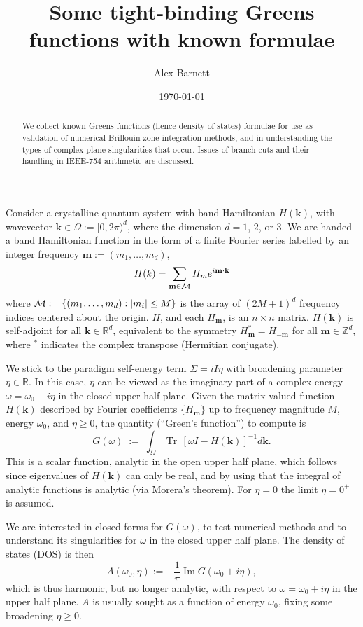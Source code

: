 \documentclass[11pt]{article}
\newcommand{\be}{\begin{equation}}
\newcommand{\ee}{\end{equation}}
\newcommand{\mbf}[1]{{\mathbf #1}}
\newcommand{\R}{\mathbb{R}}
\newcommand{\Z}{\mathbb{Z}}
\DeclareMathOperator{\im}{Im}
\DeclareMathOperator{\tr}{Tr}
\newcommand{\om}{\omega}
\newcommand{\BZ}{\Omega}
\newcommand{\kk}{\mbf{k}}
\newcommand{\mm}{\mbf{m}}
\begin{document}
\title{Some tight-binding Greens functions with known formulae}
\author{Alex Barnett}
\date{\today}
\maketitle
\begin{abstract}
  We collect known Greens functions (hence density of states)
  formulae for use as validation
  of numerical Brillouin zone integration methods, and in understanding
  the types of complex-plane singularities that occur.
  Issues of branch cuts and their handling in IEEE-754 arithmetic are discussed.
\end{abstract}

Consider a crystalline quantum system with band Hamiltonian $H(\kk)$,
with wavevector $\kk\in \BZ := [0,2\pi)^d$, where the dimension $d=1$, $2$, or $3$.
We are handed a band Hamiltonian function in the form of a finite Fourier
series labelled by an integer frequency $\mm := (m_1,\dots,m_d)$,
\be
H(k) = \sum_{\mm\in{\cal M}} H_m e^{i\mm\cdot \kk}
\label{Hk}
\ee
where ${\cal M} := \{(m_1,\dots,m_d): |m_i|\le M\}$ is the array of 
$(2M+1)^d$ frequency indices centered about the origin.
$H$, and each $H_\mm$, is an $n\times n$ matrix.
$H(\kk)$ is self-adjoint for all $\kk\in\R^d$,
equivalent to the symmetry $H_\mm^* = H_{-\mm}$ for all $\mm\in\Z^d$, where
$^*$ indicates the complex transpose (Hermitian conjugate).

We stick to the paradigm self-energy term $\Sigma = iI\eta$
with broadening parameter $\eta\in\R$.
In this case, $\eta$ can be viewed as the imaginary part of
a complex energy $\om = \om_0 + i\eta$ in the closed upper half plane.
Given the matrix-valued function $H(\kk)$
described by Fourier coefficients $\{H_\mm\}$ up to frequency magnitude $M$,
energy $\om_0$, and $\eta\ge0$,
the quantity (``Green's function'') to compute is
\be
G(\om) \;:=\;
\int_\BZ \tr\, [\om I - H(\kk)]^{-1} d\kk.
\label{G}
\ee
This is a scalar function, analytic in the open upper half plane,
which follows since eigenvalues of $H(\kk)$ can only be real, and by
using that the integral of analytic functions is analytic (via Morera's theorem).
For $\eta=0$ the limit $\eta=0^+$ is assumed.

We are interested in closed forms for $G(\om)$, to
test numerical methods and to understand
its singularities for $\om$ in the closed upper half plane.
The density of states (DOS) is then
\be
A(\om_0,\eta) := -\frac{1}{\pi}\im G(\om_0+i\eta),
\label{DOS}
\ee
which is thus harmonic, but no longer analytic, with respect to $\om=\om_0+i\eta$ in the upper half plane.
$A$ is usually sought as a function of energy $\om_0$,
fixing some broadening $\eta\ge0$.
\end{document}
